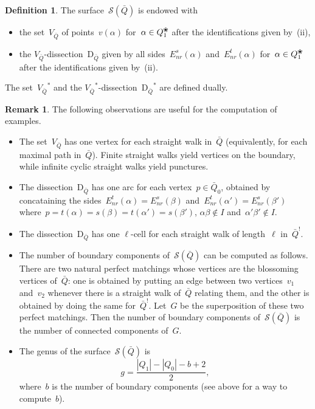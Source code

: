 \documentclass{amsart}
\theoremstyle{definition}
\newtheorem{definition}[theorem]{Definition}
\newtheorem{remark}[theorem]{Remark}
\newcommand{\blossom}{^\text{\ding{96}}} %
\newcommand{\Enrs}[1]{E_{nr}^{s}(#1)}
\newcommand{\Enrt}[1]{E_{nr}^{t}(#1)}
\newcommand{\surface}{\mathcal{S}} %
\newcommand{\dual}{^*} %
\newcommand{\dissection}{\mathrm{D}} %
\newcommand{\koszul}{^!} %
\begin{document}
\begin{definition}
\label{def:dissectionQuiver}
The surface~$\surface(\bar Q)$ is endowed with
\begin{itemize}
\item the set~$V_{\bar Q}$ of points~$v(\alpha)$ for~$\alpha \in Q_1\blossom$ after the identifications given by~(ii),
\item the $V_{\bar Q}$-dissection~$\dissection_{\bar Q}$ given by all sides~$\Enrs{\alpha}$ and~$\Enrt{\alpha}$ for~$\alpha \in Q_1\blossom$ after the identifications given by~(ii).
\end{itemize}
The set~${V_{\bar Q}}\dual$ and the ${V_{\bar Q}}\dual$-dissection~${\dissection_{\bar Q}}\dual$ are defined dually.
\end{definition}

\begin{remark}
The following observations are useful for the computation of examples.
\begin{itemize}
\item The set~$V_{\bar Q}$ has one vertex for each straight walk in~$\bar Q$ (equivalently, for each maximal path in~$\bar Q$).
      Finite straight walks yield vertices on the boundary, while infinite cyclic straight walks yield punctures.
\item The dissection~$\dissection_{\bar Q}$ has one arc for each vertex~$p \in \bar Q_0$, obtained by concataining the sides~$\Enrt{\alpha} = \Enrs{\beta}$ and~$\Enrt{\alpha'} = \Enrs{\beta'}$ where~$p = t(\alpha) = s(\beta) = t(\alpha') = s(\beta')$, $\alpha\beta \notin I$ and~$\alpha'\beta' \notin I$.
\item The dissection~$\dissection_{\bar Q}$ has one $\ell$-cell for each straight walk of length~$\ell$ in~$\bar Q\koszul$.
\item The number of boundary components of~$\surface(\bar Q)$ can be computed as follows.
      There are two natural perfect matchings whose vertices are the blossoming vertices of~$\bar Q$: one is obtained by putting an edge between two vertices~$v_1$ and~$v_2$ whenever there is a straight walk of~$\bar Q$ relating them, and the other is obtained by doing the same for~$\bar Q \koszul$.
      Let~$G$ be the superposition of these two perfect matchings.
      Then the number of boundary components of~$\surface(\bar Q)$ is the number of connected components of~$G$.
\item The genus of the surface~$\surface(\bar Q)$ is
      \[
       g = \frac{|Q_1| - |Q_0| - b + 2}{2},
      \]
      where~$b$ is the number of boundary components (see above for a way to compute~$b$).

\end{itemize}
\end{remark}
\end{document}
